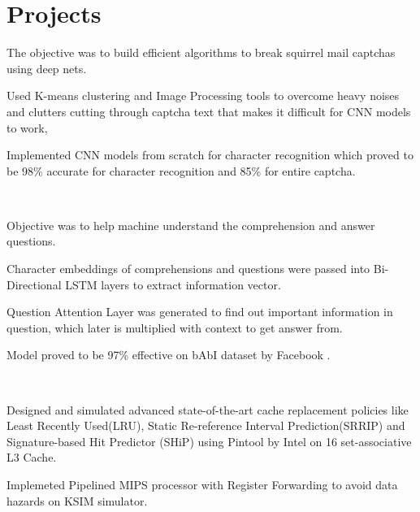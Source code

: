 \documentclass[]{deedy-resume-openfont}
\begin{document}
\begin{minipage}[t]{0.69\textwidth}
\section{Projects}

\begin{tightemize}
\item The objective was to build efficient algorithms to break squirrel mail captchas using deep nets.
\item Used K-means clustering and Image Processing tools to overcome heavy noises and clutters cutting through captcha text that makes it difficult for CNN models to work,
\item Implemented CNN models from scratch for character recognition which proved to be 98\% accurate for character recognition and 85\% for entire captcha.
\end{tightemize}

\\\hspace{0.5cm}

\begin{tightemize}
\item Objective was to help machine understand the comprehension and answer questions.
\item Character embeddings of comprehensions and questions were passed into Bi-Directional LSTM layers to extract information vector.
\item Question Attention Layer was generated to find out important information in question, which later is multiplied with context to get answer from. 
\item Model proved to be 97\% effective on bAbI dataset by Facebook .
\end{tightemize}

\\\hspace{0.5cm}

\begin{tightemize}
\item Designed and simulated advanced state-of-the-art cache replacement policies like Least Recently Used(LRU), Static Re-reference Interval Prediction(SRRIP) and Signature-based Hit Predictor (SHiP) using Pintool by Intel on 16 set-associative L3 Cache.
\item Implemeted Pipelined MIPS processor with Register Forwarding to avoid data hazards on KSIM simulator.
\end{tightemize}


\end{minipage}
\end{document}
